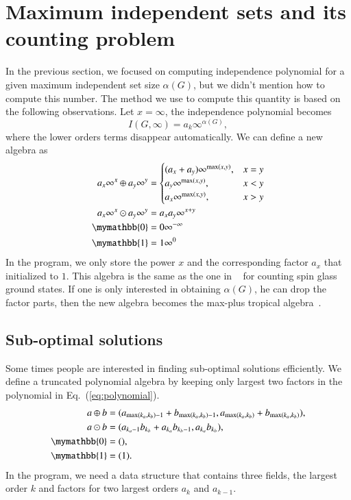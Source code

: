 \documentclass[review,onefignum,onetabnum]{siamart190516}
\newcommand{\<}{\langle}
\renewcommand{\>}{\rangle}
\newcommand{\Eq}[1]{Eq.~(\ref{#1})}
\begin{document}
\section{Maximum independent sets and its counting problem}
In the previous section, we focused on computing independence polynomial for a given maximum independent set size $\alpha(G)$, but we didn't mention how to compute this number.
The method we use to compute this quantity is based on the following observations. Let $x=\infty$, the independence polynomial becomes
\begin{equation}
I(G, \infty) = a_k \infty^{\alpha(G)},
\end{equation}
where the lower orders terms disappear automatically. We can define a new algebra as
\begin{align}
\begin{split}
    a_x\infty^x \oplus a_y\infty^y &= \begin{cases}
        (a_x + a_y)\infty^{\max(x,y)}, & x = y\\
        a_y\infty^{\max(x,y)}, & x < y\\
        a_x\infty^{\max(x,y)}, & x > y
    \end{cases}\\
    a_x\infty^x \odot a_y\infty^y &= a_x a_y\infty^{x+y}\\
    \mymathbb{0} &= 0\infty^{-\infty}\\
    \mymathbb{1} &= 1\infty^{0}\label{eq:countingtropical}
\end{split}
\end{align}
In the program, we only store the power $x$ and the corresponding factor $a_x$ that initialized to $1$.
This algebra is the same as the one in ~\cite{Liu2021} for counting spin glass ground states.
If one is only interested in obtaining $\alpha(G)$, he can drop the factor parts, then the new algebra becomes the max-plus tropical algebra~\cite{Maclagan2015,Moore2011}.

\subsection{Sub-optimal solutions}
Some times people are interested in finding sub-optimal solutions efficiently.
We define a truncated polynomial algebra by keeping only largest two factors in the polynomial in \Eq{eq:polynomial}.
\begin{align}
    \begin{split}
    a \oplus b &= (a_{\max(k_a, k_b)-1} + b_{\max(k_a, k_b)-1}, a_{\max(k_a, k_b)} + b_{\max(k_a, k_b)}),\\
    a \odot b &= (a_{k_a-1} b_{k_b}+a_{k_a} b_{k_b-1}, a_{k_a} b_{k_b}),\\
    \mymathbb{0} &= (),\\
    \mymathbb{1} &= (1).\label{eq:max2poly}
    \end{split}
\end{align}
In the program, we need a data structure that contains three fields, the largest order $k$ and factors for two largest orders $a_k$ and $a_{k-1}$.
\end{document}
